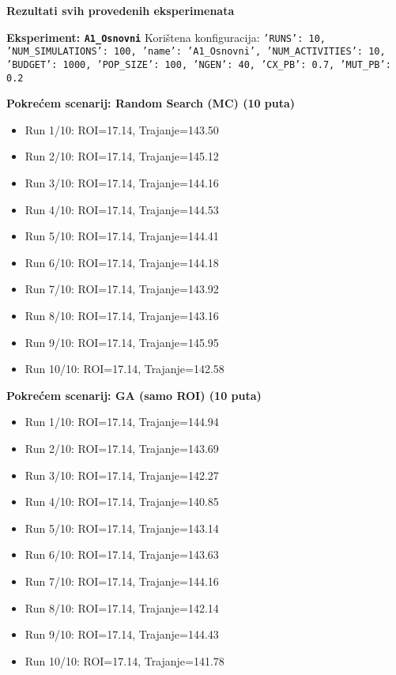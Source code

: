 \textbf{Rezultati svih provedenih eksperimenata}

\textbf{Eksperiment: \texttt{A1\_Osnovni}}
Korištena konfiguracija: \texttt{'RUNS': 10, 'NUM\_SIMULATIONS': 100, 'name': 'A1\_Osnovni', 'NUM\_ACTIVITIES': 10, 'BUDGET': 1000, 'POP\_SIZE': 100, 'NGEN': 40, 'CX\_PB': 0.7, 'MUT\_PB': 0.2}

\textbf{Pokrećem scenarij: Random Search (MC) (10 puta)}
\begin{itemize}
    \item Run 1/10: ROI=17.14, Trajanje=143.50
    \item Run 2/10: ROI=17.14, Trajanje=145.12
    \item Run 3/10: ROI=17.14, Trajanje=144.16
    \item Run 4/10: ROI=17.14, Trajanje=144.53
    \item Run 5/10: ROI=17.14, Trajanje=144.41
    \item Run 6/10: ROI=17.14, Trajanje=144.18
    \item Run 7/10: ROI=17.14, Trajanje=143.92
    \item Run 8/10: ROI=17.14, Trajanje=143.16
    \item Run 9/10: ROI=17.14, Trajanje=145.95
    \item Run 10/10: ROI=17.14, Trajanje=142.58
\end{itemize}

\textbf{Pokrećem scenarij: GA (samo ROI) (10 puta)}
\begin{itemize}
    \item Run 1/10: ROI=17.14, Trajanje=144.94
    \item Run 2/10: ROI=17.14, Trajanje=143.69
    \item Run 3/10: ROI=17.14, Trajanje=142.27
    \item Run 4/10: ROI=17.14, Trajanje=140.85
    \item Run 5/10: ROI=17.14, Trajanje=143.14
    \item Run 6/10: ROI=17.14, Trajanje=143.63
    \item Run 7/10: ROI=17.14, Trajanje=144.16
    \item Run 8/10: ROI=17.14, Trajanje=142.14
    \item Run 9/10: ROI=17.14, Trajanje=144.43
    \item Run 10/10: ROI=17.14, Trajanje=141.78
\end{itemize}

